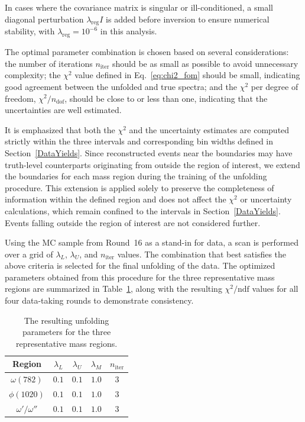 In cases where the covariance matrix is singular or ill-conditioned, a small
diagonal perturbation $\lambda_{\text{reg}} I$ is added before inversion to
ensure numerical stability, with $\lambda_{\text{reg}} = 10^{-6}$ in this
analysis.

The optimal parameter combination is chosen based on several considerations:
the number of iterations $n_{\text{iter}}$ should be as small as possible to
avoid unnecessary complexity; the $\chi^2$ value defined in
Eq.~\eqref{eq:chi2_fom} should be small, indicating good agreement between the
unfolded and true spectra; and the $\chi^2$ per degree of freedom, $\chi^2 /
    n_{\text{dof}}$, should be close to or less than one, indicating that the
uncertainties are well estimated.

It is emphasized that both the $\chi^2$ and the uncertainty estimates are
computed strictly within the three intervals and corresponding bin widths
defined in Section~\ref{DataYields}. Since reconstructed events near the
boundaries may have truth-level counterparts originating from outside the
region of interest, we extend the boundaries for each mass region during the
training of the unfolding procedure. This extension is applied solely to
preserve the completeness of information within the defined region and does not
affect the $\chi^2$ or uncertainty calculations, which remain confined to the
intervals in Section~\ref{DataYields}. Events falling outside the region of
interest are not considered further.

Using the MC sample from Round~16 as a stand-in for data, a scan is performed
over a grid of $\lambda_L$, $\lambda_U$, and $n_{\text{iter}}$ values. The
combination that best satisfies the above criteria is selected for the final
unfolding of the data. The optimized parameters obtained from this procedure
for the three representative mass regions are summarized in
Table~\ref{tab:optimized_parameters}, along with the resulting
$\chi^2/\text{ndf}$ values for all four data-taking rounds to demonstrate
consistency.

\begin{table}[t]
    \begin{center}
        \caption{The resulting unfolding parameters for the three representative mass regions.}
        \vspace{4mm}
        \renewcommand{\arraystretch}{1.3}
        \begin{tabular}{c | c | c | c | c}
            \hline \hline
            Region & $\lambda_L$ & $\lambda_U$ & $\lambda_M$ & $n_{\text{iter}}$ \\
            \hline
            $\omega(782)$ & $0.1$ & $0.1$ & $1.0$ & $3$ \\
            \hline
            $\phi(1020)$ & $0.1$ & $0.1$ & $1.0$ & $3$ \\
            \hline
            $\omega'/\omega''$ & $0.1$ & $0.1$ & $1.0$ & $3$ \\
            \hline \hline
        \end{tabular}
        \label{tab:optimized_parameters}
    \end{center}
\end{table}

